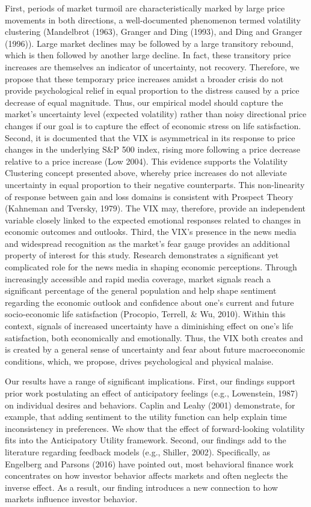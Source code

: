 \documentclass[11pt,a4paper,oldfontcommands]{memoir}
\begin{document}
{First, periods of market turmoil are characteristically marked by large price movements in both directions, a well-documented phenomenon termed volatility clustering (Mandelbrot (1963), Granger and Ding (1993), and Ding and Granger (1996)). Large market declines may be followed by a large transitory rebound, which is then followed by another large decline. In fact, these transitory price increases are themselves an indicator of uncertainty, not recovery. Therefore, we propose that these temporary price increases amidst a broader crisis do not provide psychological relief in equal proportion to the distress caused by a price decrease of equal magnitude. Thus, our empirical model should capture the market's uncertainty level (expected volatility) rather than noisy directional price changes if our goal is to capture the effect of economic stress on life satisfaction. Second, it is documented that the VIX is asymmetrical in its response to price changes in the underlying S&P 500 index, rising more following a price decrease relative to a price increase (Low 2004). This evidence supports the Volatility Clustering concept presented above, whereby price increases do not alleviate uncertainty in equal proportion to their negative counterparts. This non-linearity of response between gain and loss domains is consistent with Prospect Theory (Kahneman and Tversky, 1979). The VIX may, therefore, provide an independent variable closely linked to the expected emotional responses related to changes in economic outcomes and outlooks. Third, the VIX's presence in the news media and widespread recognition as the market's fear gauge provides an additional property of interest for this study. Research demonstrates a significant yet complicated role for the news media in shaping economic perceptions. Through increasingly accessible and rapid media coverage, market signals reach a significant percentage of the general population and help shape sentiment regarding the economic outlook and confidence about one's current and future socio-economic life satisfaction (Procopio, Terrell, & Wu, 2010). Within this context, signals of increased uncertainty have a diminishing effect on one's life satisfaction, both economically and emotionally. Thus, the VIX both creates and is created by a general sense of uncertainty and fear about future macroeconomic conditions, which, we propose, drives psychological and physical malaise.

Our results have a range of significant implications. First, our findings support prior work postulating an effect of anticipatory feelings (e.g., Lowenstein, 1987) on individual desires and behaviors. Caplin and Leahy (2001) demonstrate, for example, that adding sentiment to the utility function can help explain time inconsistency in preferences. We show that the effect of forward-looking volatility fits into the Anticipatory Utility framework. Second, our findings add to the literature regarding feedback models (e.g., Shiller, 2002). Specifically, as Engelberg and Parsons (2016) have pointed out, most behavioral finance work concentrates on how investor behavior affects markets and often neglects the inverse effect. As a result, our finding introduces a new connection to how markets influence investor behavior.


}
\end{document}
